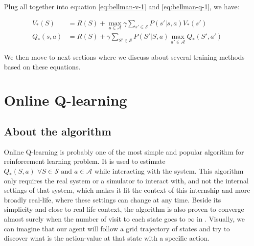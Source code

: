 \documentclass[
  a4paper, xcolor = usenames,dvipsnames]{article}
\begin{document}
Plug all together into equation \eqref{eq:bellman-v-1} and \eqref{eq:bellman-q-1}, we have:

\begin{align}
V_{*}(S) &= R(S) + \max_{a \in \mathcal{A}} \gamma \sum_{s' \in \mathcal{S}} P(s' | s, a) V_{*}(s')
\label{eq:bellman-max-v} \\
Q_{*}(s, a) &= R(S) + \gamma \sum_{S' \in \mathcal{S}} P(S' | S, a) \max_{a' \in \mathcal{A}} Q_{*}(S', a')
\label{eq:bellman-max-q}
\end{align}

We then move to next sections where we discuss about several training methods based on these equations.

\hypertarget{online-q-learning}{%
\section{Online Q-learning}\label{online-q-learning}}

\hypertarget{about-the-algorithm}{%
\subsection{About the algorithm}\label{about-the-algorithm}}

Online Q-learning is probably one of the most simple and popular algorithm for reinforcement learning problem. It is used to estimate \(Q_{*}(S, a) \,\, \forall S \in \mathcal{S} \text{ and } a \in \mathcal{A}\) while interacting with the system. This algorithm only requires the real system or a simulator to interact with, and not the internal settings of that system, which makes it fit the context of this internship and more broadly real-life, where these settings can change at any time. Beside its simplicity and close to real life context, the algorithm is also proven to converge almost surely when the number of visit to each state goes to \(\infty\) in \autocite{q-learning-converge}. Visually, we can imagine that our agent will follow a grid trajectory of states and try to discover what is the action-value at that state with a specific action.
\end{document}
